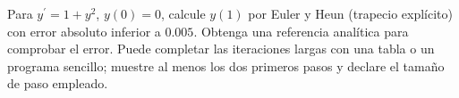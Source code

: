Para $y^{\prime}=1+y^2$, $y(0)=0$, calcule $y(1)$ por Euler y Heun (trapecio explícito) con error absoluto inferior a $0.005$. Obtenga una referencia analítica para comprobar el error. Puede completar las iteraciones largas con una tabla o un programa sencillo; muestre al menos los dos primeros pasos y declare el tamaño de paso empleado.
